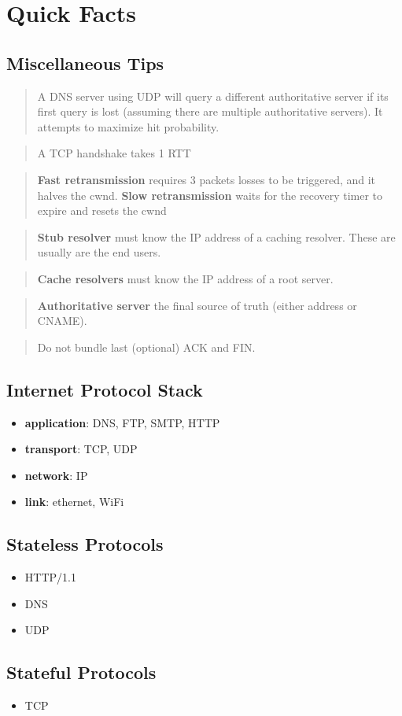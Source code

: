 \section{Quick Facts}
\subsection{Miscellaneous Tips}
\footnotesize
\blockquote{A DNS server using UDP will query a different authoritative
server if its first query is lost (assuming there are multiple
authoritative servers). It attempts to maximize hit probability.}

\blockquote{A TCP handshake takes 1 RTT}

\blockquote{\textbf{Fast retransmission} requires 3 packets losses to be
triggered, and it halves the cwnd. \textbf{Slow retransmission} waits
for the recovery timer to expire and resets the cwnd}

\blockquote{\textbf{Stub resolver} must know the IP address of a caching
resolver. These are usually are the end users.}

\blockquote{\textbf{Cache resolvers} must know the IP address of a root
server.}

\blockquote{\textbf{Authoritative server} the final source of truth
(either address or CNAME).}

\blockquote{Do not bundle last (optional) ACK and FIN.}

\small
\subsection{Internet Protocol Stack}
\begin{itemize}[itemsep=0em]
  \item \textbf{application}: DNS, FTP, SMTP, HTTP
  \item \textbf{transport}: TCP, UDP
  \item \textbf{network}: IP
  \item \textbf{link}: ethernet, WiFi
\end{itemize}
\subsection{Stateless Protocols}
\begin{itemize}[itemsep=0em]
  \item HTTP/1.1
  \item DNS
  \item UDP
\end{itemize}
\subsection{Stateful Protocols}
\begin{itemize}[itemsep=0em]
  \item TCP
\end{itemize}
